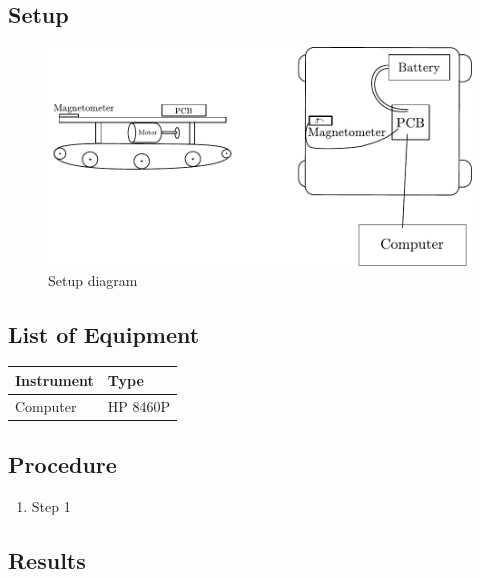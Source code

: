 \subsection{Setup}
\begin{figure}[H]
  \centering
  \includegraphics[scale=0.8]{figures/magnetoCalibSetup.pdf}
  \caption{Setup diagram}
  \label{fig:calibrationSetupDiagram}
\end{figure}

\subsection{List of Equipment}

\begin{table}[H]
\begin{tabular}{|p{10cm}|p{4cm}|}
\hline%
  \textbf{Instrument}                     &  \textbf{Type}       \\
\hline%
  Computer                                &  HP 8460P            \\
\hline %
\end{tabular}
\end{table}

\subsection{Procedure}

\begin{enumerate}
  \item Step 1
\end{enumerate}

\subsection{Results} \label{magnetoCalibrationResults}


